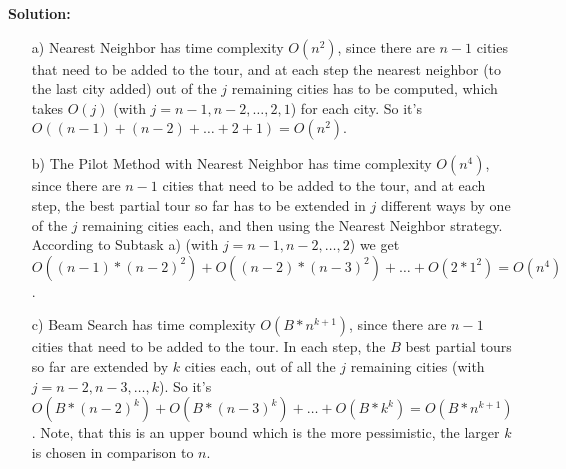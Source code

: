\textbf{Solution:}
\begin{enumerate}
\item[a)] Nearest Neighbor has time complexity $O(n^2)$, since there are $n-1$ cities that need to be added to the tour, and at each step the nearest neighbor (to the last city added) out of the $j$ remaining cities has to be computed, which takes $O(j)$ (with $j = n-1, n-2, \ldots, 2, 1$) for each city. So it’s $O((n-1) + (n-2) + \ldots + 2 + 1) = O(n^2)$.
\item[b)] The Pilot Method with Nearest Neighbor has time complexity $O(n^4)$, since there are $n-1$ cities that need to be added to the tour, and at each step, the best partial tour so far has to be extended in $j$ different ways by one of the $j$ remaining cities each, and then using the Nearest Neighbor strategy. According to Subtask a) (with $j = n-1, n-2, \ldots, 2$) we get $O((n-1)*(n-2)^2) + O((n-2)*(n-3)^2) + \ldots + O(2*1^2) = O(n^4)$.
\item[c)] Beam Search has time complexity $O(B*n^{k+1})$, since there are $n-1$ cities that need to be added to the tour. In each step, the $B$ best partial tours so far are extended by $k$ cities each, out of all the $j$ remaining cities (with $j = n-2, n-3, \ldots, k$). So it’s $O(B*(n-2)^k) + O(B*(n-3)^k) + \ldots + O(B*k^k) = O(B*n^{k+1})$. Note, that this is an upper bound which is the more pessimistic, the larger $k$ is chosen in comparison to $n$.
\end{enumerate}

